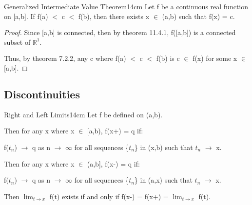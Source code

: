     \newpage



    \begin{wtheorem}{Generalized Intermediate Value Theorem}{14cm}
        Let f be a continuous real function on [a,b]. If f(a) $<$ c $<$ f(b),
        then there exists x $\in$ (a,b) such that f(x) = c.
    \end{wtheorem}

    \begin{proof}
        Since [a,b] is connected, then by {\color{red} theorem 11.4.1},
        f([a,b]) is a connected subset of $\mathbb{R}^1$.

        Thus, by {\color{red} theorem 7.2.2}, any c where f(a) $<$ c $<$ f(b)
        is c $\in$ f(x) for some x $\in$ [a,b].
    \end{proof}

    \vspace{0.3cm}





\subsection{ Discontinuities }

    \begin{definition}{Right and Left Limits}{14cm}
        \small
        Let f be defined on (a,b).
        
        \vspace{0.2cm}

        Then for any x where x $\in$ [a,b), f(x+) = q if:
        
        \hspace{1cm}
        f($t_n$) $\rightarrow$ q as n $\rightarrow$ $\infty$
        for all sequences \{$t_n$\} in (x,b) such that $t_n$ $\rightarrow$ x.

        \vspace{0.2cm}

        Then for any x where x $\in$ (a,b], f(x-) = q if:
        
        \hspace{1cm}
        f($t_n$) $\rightarrow$ q as n $\rightarrow$ $\infty$
        for all sequences \{$t_n$\} in (a,x) such that $t_n$ $\rightarrow$ x.

        \vspace{0.2cm}

        Then $\lim_{t \rightarrow x}$ f(t) exists if and only if
        f(x-) = f(x+) = $\lim_{t \rightarrow x}$ f(t).
    \end{definition}


